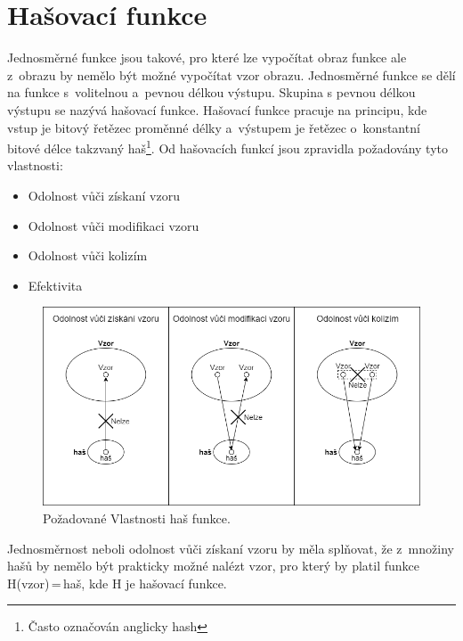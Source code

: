 \section{Hašovací funkce}
\label{sec:hashFunction}
Jednosměrné funkce jsou takové, pro které lze vypočítat obraz funkce ale z~obrazu by nemělo být možné vypočítat vzor obrazu. Jednosměrné funkce se dělí na funkce s~volitelnou a~pevnou délkou výstupu.\cite{Burda9788021446120ISBN} %
Skupina s pevnou délkou výstupu se nazývá hašovací funkce. Hašovací funkce pracuje na principu, kde vstup je bitový řetězec proměnné délky a~výstupem je řetězec o~konstantní bitové délce takzvaný haš\footnote{Často označován anglicky hash}.\cite{Mao0130669431ISBN}%
\newline
Od hašovacích funkcí jsou zpravidla požadovány tyto vlastnosti:
\begin{itemize}
    \item Odolnost vůči získaní vzoru
    \item Odolnost vůči modifikaci vzoru
    \item Odolnost vůči kolizím
    \item Efektivita
\end{itemize}
\begin{figure}[!h]
  \begin{center}
    \includegraphics[scale=0.4]{obrazky/HashFunction.png}
  \end{center}
  \caption[Požadované vlastnosti haš funkce]{Požadované Vlastnosti haš funkce.\footnotemark\cite{Burda9788021446120ISBN}}
  \label{img:HashFunction}
\end{figure}
Jednosměrnost neboli odolnost vůči získaní vzoru by měla splňovat, že z~množiny hašů by nemělo být prakticky možné nalézt vzor, pro který by platil funkce H(vzor)\,=\,haš, kde H je hašovací funkce.


